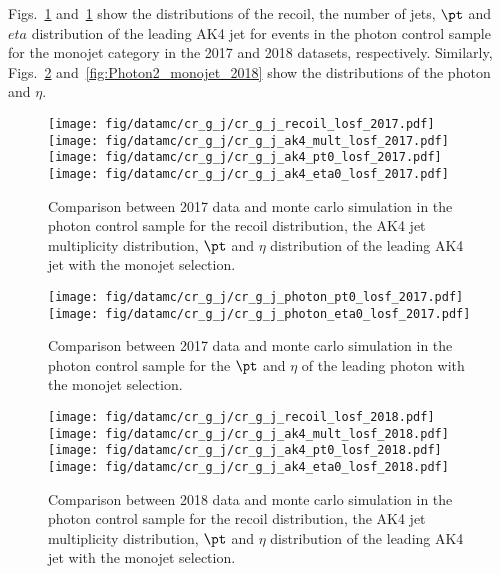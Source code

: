 Figs.~\ref{fig:Photon_monojet_2017} and~\ref{fig:Photon_monojet_2017} show the distributions of the recoil, the number of jets, $\pt$ and $eta$ distribution of the leading AK4 jet for events in the photon control sample for the monojet category in the 2017 and 2018 datasets, respectively. Similarly, Figs.~\ref{fig:Photon2_monojet_2017} and~\ref{fig:Photon2_monojet_2018} show the distributions of the photon \pt and $\eta$.

\begin{figure}[htbp]
    \begin{center}
        \texttt{[image: fig/datamc/cr\_g\_j/cr\_g\_j\_recoil\_losf\_2017.pdf]}
        \texttt{[image: fig/datamc/cr\_g\_j/cr\_g\_j\_ak4\_mult\_losf\_2017.pdf]} \\
        \texttt{[image: fig/datamc/cr\_g\_j/cr\_g\_j\_ak4\_pt0\_losf\_2017.pdf]}
        \texttt{[image: fig/datamc/cr\_g\_j/cr\_g\_j\_ak4\_eta0\_losf\_2017.pdf]}
    \end{center}
    \caption{Comparison between 2017 data and monte carlo simulation in the photon  control sample for
        the recoil distribution, the AK4 jet multiplicity distribution,  $\pt$ and $\eta$ distribution
        of the leading AK4  jet with the monojet selection.}
    \label{fig:Photon_monojet_2017}
\end{figure}

\begin{figure}[htbp]
    \begin{center}
        \texttt{[image: fig/datamc/cr\_g\_j/cr\_g\_j\_photon\_pt0\_losf\_2017.pdf]}
        \texttt{[image: fig/datamc/cr\_g\_j/cr\_g\_j\_photon\_eta0\_losf\_2017.pdf]}
    \end{center}
    \caption{Comparison between 2017 data and monte carlo simulation in the photon  control sample for
        the $\pt$ and $\eta$ of the leading photon with the monojet selection.}
    \label{fig:Photon2_monojet_2017}
\end{figure}

\begin{figure}[htbp]
    \begin{center}
        \texttt{[image: fig/datamc/cr\_g\_j/cr\_g\_j\_recoil\_losf\_2018.pdf]}
        \texttt{[image: fig/datamc/cr\_g\_j/cr\_g\_j\_ak4\_mult\_losf\_2018.pdf]} \\
        \texttt{[image: fig/datamc/cr\_g\_j/cr\_g\_j\_ak4\_pt0\_losf\_2018.pdf]}
        \texttt{[image: fig/datamc/cr\_g\_j/cr\_g\_j\_ak4\_eta0\_losf\_2018.pdf]}
    \end{center}
    \caption{Comparison between 2018 data and monte carlo simulation in the photon  control sample for
        the recoil distribution, the AK4 jet multiplicity distribution,  $\pt$ and $\eta$ distribution
        of the leading AK4  jet with the monojet selection.}
    \label{fig:Photon_monojet_2018}
\end{figure}

